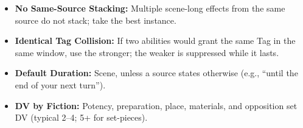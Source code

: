 \begin{itemize}
  \item \textbf{No Same-Source Stacking:} Multiple scene-long effects from the same source do not stack; take the best instance.
  \item \textbf{Identical Tag Collision:} If two abilities would grant the same Tag in the same window, use the stronger; the weaker is suppressed while it lasts.
  \item \textbf{Default Duration:} Scene, unless a source states otherwise (e.g., ``until the end of your next turn'').
  \item \textbf{DV by Fiction:} Potency, preparation, place, materials, and opposition set DV (typical 2--4; 5+ for set-pieces).
\end{itemize}